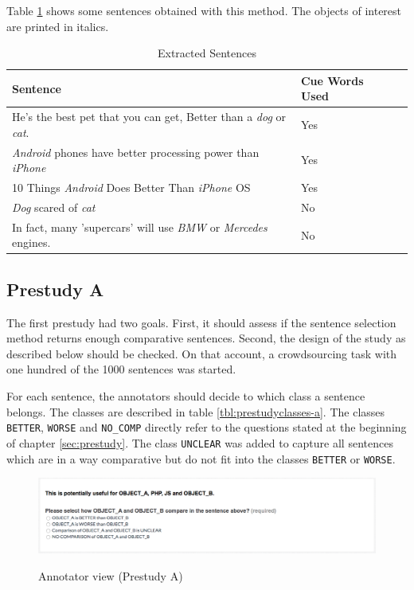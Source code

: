 Table \ref{tbl:example_sentences} shows some sentences obtained with this method. The objects of interest are printed in italics.

\begin{table}[h]
\centering
\caption{Extracted Sentences}
\label{tbl:example_sentences}
\begin{tabular}{@{}llr@{}}
\toprule
 Sentence   &  Cue Words Used                      \\ \midrule
 He's the best pet that you can get, Better than a \emph{dog} or \emph{cat}. & Yes \\
\emph{Android} phones have better processing power than \emph{iPhone} & Yes \\
 10 Things \emph{Android} Does Better Than \emph{iPhone} OS & Yes \\
 \emph{Dog} scared of \emph{cat} & No \\
 In fact, many 'supercars' will use \emph{BMW} or \emph{Mercedes} engines. & No \\

\bottomrule  
                               
\end{tabular}
\end{table}



\subsection{Prestudy A}
The first prestudy had two goals. First, it should assess if the sentence selection method returns enough comparative sentences. Second, the design of the study as described below should be checked. On that account, a crowdsourcing task with one hundred of the 1000 sentences was started.



For each sentence, the annotators should decide to which class a sentence belongs. The classes are described in table \ref{tbl:prestudyclasses-a}. The classes \texttt{BETTER}, \texttt{WORSE} and \texttt{NO\_COMP} directly refer to the questions stated at the beginning of chapter \ref{sec:prestudy}. The class \texttt{UNCLEAR} was added to capture all sentences which are in a way comparative but do not fit into the classes \texttt{BETTER} or \texttt{WORSE}.

\begin{figure}[h]
\centering
\includegraphics[width=1\textwidth]{images/prestudy/1_question}
\label{img:1_question}
\caption{Annotator view (Prestudy A)}
\end{figure}

